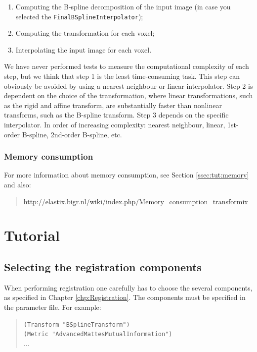 \documentclass[]{report}
\begin{document}
\begin{enumerate}
\item Computing the B-spline decomposition of the input image (in case you selected the
\texttt{FinalBSplineInterpolator});

\item Computing the transformation for each voxel;

\item Interpolating the input image for each voxel.
\end{enumerate}
We have never performed tests to measure the computational
complexity of each step, but we think that step 1 is the least
time-consuming task. This step can obviously be avoided by using a
nearest neighbour or linear interpolator. Step 2 is dependent on the
choice of the transformation, where linear transformations, such as
the rigid and affine transform, are substantially faster than
nonlinear transforms, such as the B-spline transform. Step 3 depends
on the specific interpolator. In order of increasing complexity:
nearest neighbour, linear, 1st-order B-spline, 2nd-order B-spline,
etc.


\subsection{Memory consumption}

For more information about memory consumption, see Section
\ref{ssec:tut:memory} and also:
\begin{quote}
\url{http://elastix.bigr.nl/wiki/index.php/Memory_consumption_transformix}
\end{quote}


\chapter{Tutorial}\label{chp:Tutorial}


\section{Selecting the registration components}

When performing registration one carefully has to choose the
several components, as specified in Chapter
\ref{chp:Registration}. The components must be specified in the
parameter file. For example:
\begin{quote}
\texttt{(Transform "BSplineTransform")}\\
\texttt{(Metric "AdvancedMattesMutualInformation")}\\
$\ldots$
\end{quote}
\end{document}
